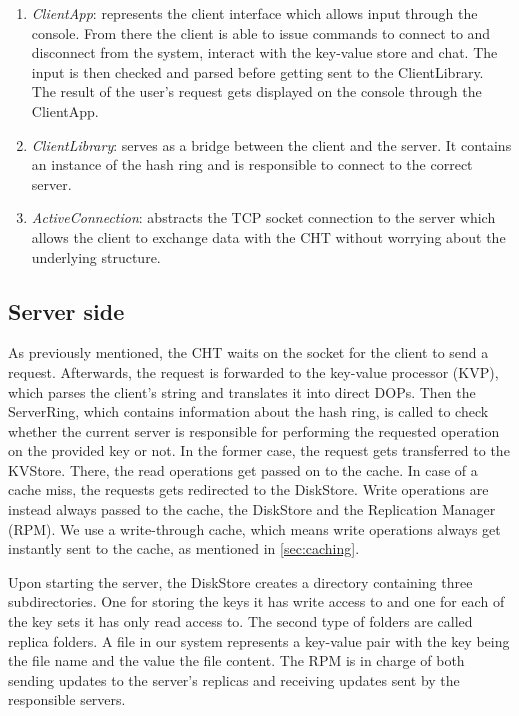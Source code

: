 \begin{enumerate} 
  \item \textit{ClientApp}: represents the client interface which allows input through the console. From there the client is able to issue commands to connect to and disconnect from the system, interact with the key-value store and chat. The input is then checked and parsed before getting sent to the ClientLibrary. The result of the user's request gets displayed on the console through the ClientApp.
  \item \textit{ClientLibrary}: serves as a bridge between the client and the server. It contains an instance of the hash ring and is responsible to connect to the correct server.
  \item \textit{ActiveConnection}: abstracts the TCP socket connection to the server which allows the client to exchange data with the CHT without worrying about the underlying structure.
\end{enumerate}
 
\subsection{Server side}

As previously mentioned, the CHT waits on the socket for the client to send a request. Afterwards, the request is forwarded to the key-value processor (KVP), which parses the client's string and translates it into direct DOPs. Then the ServerRing, which contains information about the hash ring, is called to check whether the current server is responsible for performing the requested operation on the provided key or not. In the former case, the request gets transferred to the KVStore. There, the read operations get passed on to the cache. In case of a cache miss, the requests gets redirected to the DiskStore. Write operations are instead always passed to the cache, the DiskStore and the Replication Manager (RPM). We use a write-through cache, which means write operations always get instantly sent to the cache, as mentioned in \ref{sec:caching}.

Upon starting the server, the DiskStore creates a directory containing three subdirectories. One for storing the keys it has write access to and one for each of the key sets it has only read access to. The second type of folders are called replica folders. A file in our system represents a key-value pair with the key being the file name and the value the file content.
The RPM is in charge of both sending updates to the server's replicas and receiving updates sent by the responsible servers.

